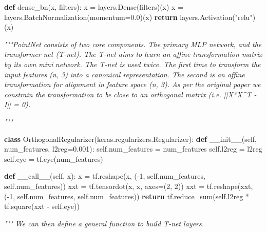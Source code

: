 \documentclass[
  12pt,
  a4paper,
]{article}
\newenvironment{Shaded}{}{}
\newcommand{\CommentTok}[1]{\textcolor[rgb]{0.38,0.63,0.69}{\textit{#1}}}
\newcommand{\ControlFlowTok}[1]{\textcolor[rgb]{0.00,0.44,0.13}{\textbf{#1}}}
\newcommand{\DecValTok}[1]{\textcolor[rgb]{0.25,0.63,0.44}{#1}}
\newcommand{\FloatTok}[1]{\textcolor[rgb]{0.25,0.63,0.44}{#1}}
\newcommand{\FunctionTok}[1]{\textcolor[rgb]{0.02,0.16,0.49}{#1}}
\newcommand{\KeywordTok}[1]{\textcolor[rgb]{0.00,0.44,0.13}{\textbf{#1}}}
\newcommand{\NormalTok}[1]{#1}
\newcommand{\OperatorTok}[1]{\textcolor[rgb]{0.40,0.40,0.40}{#1}}
\newcommand{\StringTok}[1]{\textcolor[rgb]{0.25,0.44,0.63}{#1}}
\newcommand{\VariableTok}[1]{\textcolor[rgb]{0.10,0.09,0.49}{#1}}
\begin{document}
\begin{Shaded}
\begin{Highlighting}[]
\KeywordTok{def}\NormalTok{ dense\_bn(x, filters):}
\NormalTok{    x }\OperatorTok{=}\NormalTok{ layers.Dense(filters)(x)}
\NormalTok{    x }\OperatorTok{=}\NormalTok{ layers.BatchNormalization(momentum}\OperatorTok{=}\FloatTok{0.0}\NormalTok{)(x)}
    \ControlFlowTok{return}\NormalTok{ layers.Activation(}\StringTok{"relu"}\NormalTok{)(x)}

\CommentTok{"""PointNet consists of two core components. The primary MLP network, and the transformer}
\CommentTok{net (T{-}net). The T{-}net aims to learn an affine transformation matrix by its own mini}
\CommentTok{network. The T{-}net is used twice. The first time to transform the input features (n, 3)}
\CommentTok{into a canonical representation. The second is an affine transformation for alignment in}
\CommentTok{feature space (n, 3). As per the original paper we constrain the transformation to be}
\CommentTok{close to an orthogonal matrix (i.e. ||X*X\^{}T {-} I|| = 0).}

\CommentTok{"""}

\KeywordTok{class}\NormalTok{ OrthogonalRegularizer(keras.regularizers.Regularizer):}
    \KeywordTok{def} \FunctionTok{\_\_init\_\_}\NormalTok{(}\VariableTok{self}\NormalTok{, num\_features, l2reg}\OperatorTok{=}\FloatTok{0.001}\NormalTok{):}
        \VariableTok{self}\NormalTok{.num\_features }\OperatorTok{=}\NormalTok{ num\_features}
        \VariableTok{self}\NormalTok{.l2reg }\OperatorTok{=}\NormalTok{ l2reg}
        \VariableTok{self}\NormalTok{.eye }\OperatorTok{=}\NormalTok{ tf.eye(num\_features)}

    \KeywordTok{def} \FunctionTok{\_\_call\_\_}\NormalTok{(}\VariableTok{self}\NormalTok{, x):}
\NormalTok{        x }\OperatorTok{=}\NormalTok{ tf.reshape(x, (}\OperatorTok{{-}}\DecValTok{1}\NormalTok{, }\VariableTok{self}\NormalTok{.num\_features, }\VariableTok{self}\NormalTok{.num\_features))}
\NormalTok{        xxt }\OperatorTok{=}\NormalTok{ tf.tensordot(x, x, axes}\OperatorTok{=}\NormalTok{(}\DecValTok{2}\NormalTok{, }\DecValTok{2}\NormalTok{))}
\NormalTok{        xxt }\OperatorTok{=}\NormalTok{ tf.reshape(xxt, (}\OperatorTok{{-}}\DecValTok{1}\NormalTok{, }\VariableTok{self}\NormalTok{.num\_features, }\VariableTok{self}\NormalTok{.num\_features))}
        \ControlFlowTok{return}\NormalTok{ tf.reduce\_sum(}\VariableTok{self}\NormalTok{.l2reg }\OperatorTok{*}\NormalTok{ tf.square(xxt }\OperatorTok{{-}} \VariableTok{self}\NormalTok{.eye))}

\CommentTok{""" We can then define a general function to build T{-}net layers.}


\end{Highlighting}
\end{Shaded}
\end{document}
